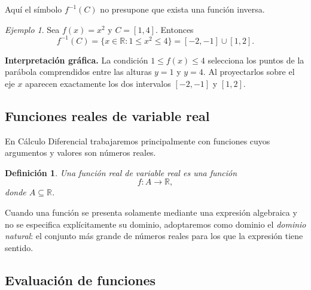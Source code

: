 \documentclass[12pt]{article}
\newtheorem{definicion}{Definición}[section]
\theoremstyle{remark}
\newtheorem{ejemplo}{Ejemplo}[section]
\newcommand{\R}{\mathbb{R}}
\begin{document}
Aquí el símbolo $f^{-1}(C)$ no presupone que exista una función inversa.

\begin{ejemplo}
Sea $f(x)=x^2$ y $C=[1,4]$. Entonces
\[
f^{-1}(C)=\{x\in\R:1\leq x^2\leq4\}
=[-2,-1]\cup[1,2].
\]

\textbf{Interpretación gráfica.} La condición $1\leq f(x)\leq4$ selecciona
los puntos de la parábola comprendidos entre las alturas $y=1$ y $y=4$.
Al proyectarlos sobre el eje $x$ aparecen exactamente los dos intervalos
$[-2,-1]$ y $[1,2]$.
\begin{center}
\end{center}
\end{ejemplo}

\subsection*{Funciones reales de variable real}

En Cálculo Diferencial trabajaremos principalmente con funciones cuyos
argumentos y valores son números reales.

\begin{definicion}
Una función real de variable real es una función
\[
f:A\to\R,
\]
donde $A\subseteq\R$.
\end{definicion}

Cuando una función se presenta solamente mediante una expresión algebraica y
no se especifica explícitamente su dominio, adoptaremos como dominio el
\emph{dominio natural}: el conjunto más grande de números reales para los que
la expresión tiene sentido.

\subsection*{Evaluación de funciones}
\end{document}
